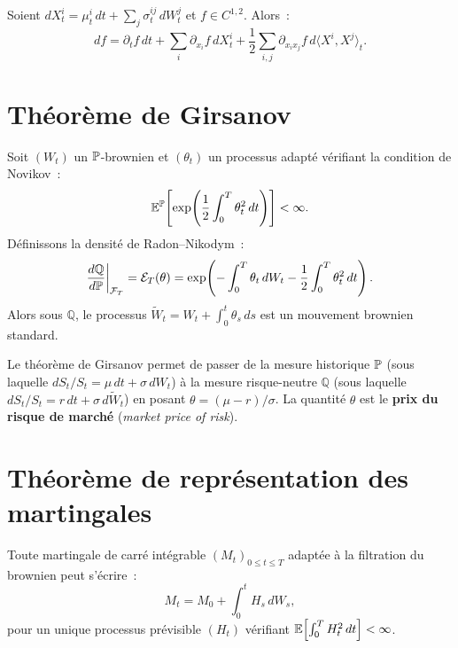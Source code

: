 \begin{theoreme}
Soient $dX_t^i = \mu_t^i\,dt + \sum_j \sigma_t^{ij}\,dW_t^j$ et
$f \in C^{1,2}$. Alors~:
\[
    df = \partial_t f\,dt + \sum_i \partial_{x_i}f\,dX_t^i
    + \frac{1}{2}\sum_{i,j}\partial_{x_i x_j}f\,
    d\langle X^i, X^j\rangle_t.
\]
\end{theoreme}

\section{Th\'eor\`eme de Girsanov}

\begin{theoreme}[Girsanov]
\label{thm:girsanov}
Soit $(W_t)$ un $\mathbb{P}$-brownien et $(\theta_t)$ un processus adapt\'e
v\'erifiant la condition de Novikov~:
\[
    \mathbb{E}^{\mathbb{P}}\!\left[\exp\!\left(\frac{1}{2}\int_0^T \theta_t^2\,dt\right)\right]
    < \infty.
\]
D\'efinissons la densit\'e de Radon--Nikodym~:
\[
    \frac{d\mathbb{Q}}{d\mathbb{P}}\bigg|_{\mathcal{F}_T}
    = \mathcal{E}_T(\theta) = \exp\!\left(-\int_0^T \theta_t\,dW_t
    - \frac{1}{2}\int_0^T \theta_t^2\,dt\right).
\]
Alors sous $\mathbb{Q}$, le processus
$\tilde{W}_t = W_t + \int_0^t \theta_s\,ds$
est un mouvement brownien standard.
\end{theoreme}

\begin{intuition}[title=\textbf{Application \`a la finance}]
Le th\'eor\`eme de Girsanov permet de passer de la mesure historique $\mathbb{P}$
(sous laquelle $dS_t/S_t = \mu\,dt + \sigma\,dW_t$) \`a la mesure
risque-neutre $\mathbb{Q}$ (sous laquelle $dS_t/S_t = r\,dt +
\sigma\,d\tilde{W}_t$) en posant $\theta = (\mu - r)/\sigma$.
La quantit\'e $\theta$ est le \textbf{prix du risque de march\'e}
(\textit{market price of risk}).
\end{intuition}

\section{Th\'eor\`eme de repr\'esentation des martingales}

\begin{theoreme}
\label{thm:representation}
Toute martingale de carr\'e int\'egrable $(M_t)_{0 \leq t \leq T}$
adapt\'ee \`a la filtration du brownien peut s'\'ecrire~:
\[
    M_t = M_0 + \int_0^t H_s\,dW_s,
\]
pour un unique processus pr\'evisible $(H_t)$ v\'erifiant
$\mathbb{E}\!\left[\int_0^T H_t^2\,dt\right] < \infty$.
\end{theoreme}

